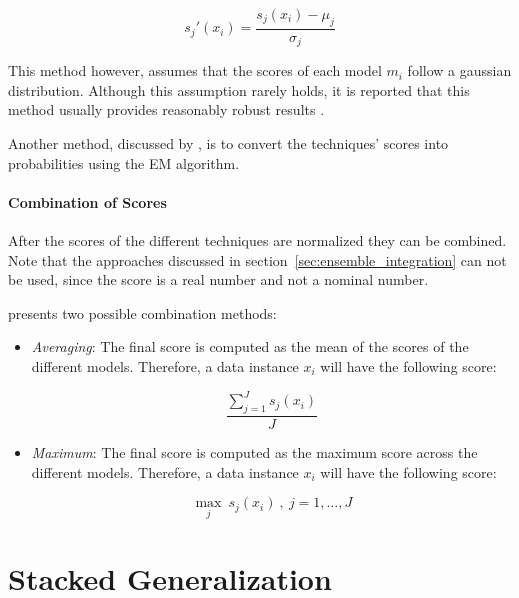 {\begin{itemize}
	\begin{equation}\label{eq:standardization}
	s_j'(x_i) = \frac{s_j(x_i) - \mu_j}{\sigma_j}
	\end{equation}
	
	This method however, assumes that the scores of each model $m_i$ follow a gaussian distribution. Although this assumption rarely holds, it is reported that this method usually provides reasonably robust results \cite{Aggarwal:2013:OA:2436823}.
	
\end{itemize}

Another method, discussed by \textcite{Gao:2006:COS:1193207.1193286}, is to convert the techniques' scores into probabilities using the EM algorithm.

\paragraph{Combination of Scores}\mbox{}

After the scores of the different techniques are normalized they can be combined.
Note that the approaches discussed in section~\ref{sec:ensemble_integration} can not be used, since the score is a real number and not a nominal number.

\textcite{Aggarwal:2013:OA:2436823} presents two possible combination methods:

\begin{itemize}
	\item \textit{Averaging}:
	The final score is computed as the mean of the scores of the different models. Therefore, a data instance $x_i$ will have the following score:
	
	\begin{equation}
	\frac{\sum_{j = 1}^J s_j(x_i)}{J} 
	\end{equation}
	
	\item \textit{Maximum}:
	The final score is computed as the maximum score across the different models. Therefore, a data instance $x_i$ will have the following score:
	
	\begin{equation}
	\max_{j} \ s_j(x_i) \ , \ j = 1, \dots, J 
	\end{equation}
	
\end{itemize}

\section{Stacked Generalization}\label{sec:stacking}

}
